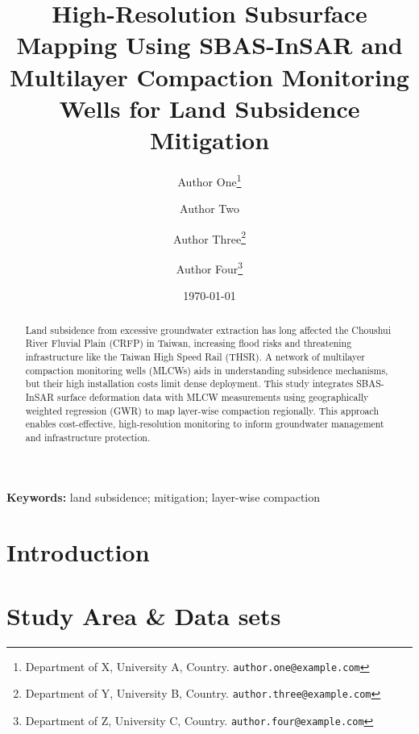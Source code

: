 \documentclass[12pt,twoside]{article}
\newcommand{\keywords}[1]{\vspace{2mm}\noindent\textbf{Keywords:} #1}
\begin{document}
\title{\textbf{High-Resolution Subsurface Mapping Using SBAS-InSAR and Multilayer Compaction Monitoring Wells for Land Subsidence Mitigation}}
\author{
  Author One\thanks{Department of X, University A, Country. \texttt{author.one@example.com}} \and
  Author Two\footnotemark[1] \and
  Author Three\thanks{Department of Y, University B, Country. \texttt{author.three@example.com}} \and
  Author Four\thanks{Department of Z, University C, Country. \texttt{author.four@example.com}}
}
\date{\today}
\maketitle

\begin{abstract}
Land subsidence from excessive groundwater extraction has long affected the Choushui River Fluvial Plain (CRFP) in Taiwan, increasing flood risks and threatening infrastructure like the Taiwan High Speed Rail (THSR). A network of multilayer compaction monitoring wells (MLCWs) aids in understanding subsidence mechanisms, but their high installation costs limit dense deployment. This study integrates SBAS-InSAR surface deformation data with MLCW measurements using geographically weighted regression (GWR) to map layer-wise compaction regionally. This approach enables cost-effective, high-resolution monitoring to inform groundwater management and infrastructure protection.
\end{abstract}

\keywords{land subsidence; mitigation; layer-wise compaction}

\tableofcontents
\listoffigures
\listoftables
\clearpage

\setcounter{page}{1}
\linenumbers %

\section{Introduction}
\label{sec:intro}

\section{Study Area \& Data sets}
\label{sec:studyarea}


\label{sec:dataset}

\end{document}
